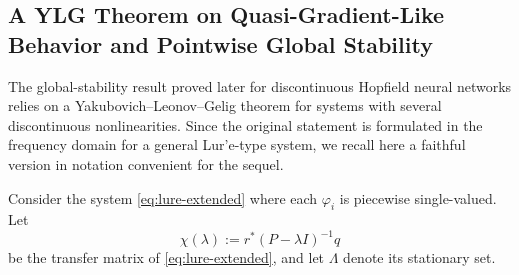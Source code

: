 \documentclass[journal]{IEEEtran}
\theoremstyle{myplain}
\begin{document}
\subsection{A YLG Theorem on Quasi-Gradient-Like Behavior and Pointwise Global Stability}
\label{sec:ylg-theorem}

The global-stability result proved later for discontinuous Hopfield neural
networks relies on a Yakubovich--Leonov--Gelig theorem for systems with several
discontinuous nonlinearities. Since the original statement is formulated in the
frequency domain for a general Lur'e-type system, we recall here a faithful
version in notation convenient for the sequel.

Consider the system \eqref{eq:lure-extended}
where each \(\varphi_i\) is piecewise
single-valued. Let
\begin{equation}
  \chi(\lambda) := r^{*}(P-\lambda I)^{-1}q
  \label{eq:ylg-transfer}
\end{equation}
be the transfer matrix of \eqref{eq:lure-extended}, and let
\(\Lambda\) denote its stationary set.
\end{document}
